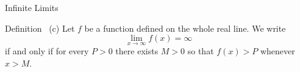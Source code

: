 
\begin{frame}[t]{Infinite Limits}
\begin{block}{Definition~ (c)}
Let $f$ be a function defined on the whole real line. We write
\[\lim_{x \to \infty}f(x)=\infty\]
if and only if for every \alert<2|handout:0>{$P>0$} there exists \alert<3|handout:0>{$M>0$} so that \alert<4|handout:0>{$f(x)>P$ whenever $x>M$}.
\end{block}
\begin{center}\end{center}
\end{frame}


